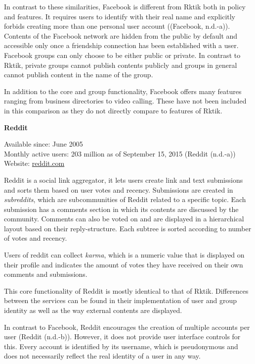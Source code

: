 In contrast to these similarities, Facebook is different from Rktik both
in policy and features. It requires users to identify with their real
name and explicitly forbids creating more than one personal user account
((Facebook, n.d.-a)). Contents of the Facebook network are hidden from
the public by default and accessible only once a friendship connection
has been established with a user. Facebook groups can only choose to be
either public or private. In contrast to Rktik, private groups cannot
publish contents publicly and groups in general cannot publish content
in the name of the group.

In addition to the core and group functionality, Facebook offers many
features ranging from business directories to video calling. These have
not been included in this comparison as they do not directly compare to
features of Rktik.

\textbf{Reddit}

Available since: June 2005\\
Monthly active users: 203 million as of September 15, 2015 (Reddit
(n.d.-a))\\
Website: \href{https://reddit.com}{reddit.com}

Reddit is a social link aggregator, it lets users create link and text
submissions and sorts them based on user votes and recency. Submissions
are created in \emph{subreddits}, which are subcommunities of Reddit
related to a specific topic. Each submission has a comments section in
which its contents are discussed by the community. Comments can also be
voted on and are displayed in a hierarchical layout based on their
reply-structure. Each subtree is sorted according to number of votes and
recency.

Users of reddit can collect \emph{karma}, which is a numeric value that
is displayed on their profile and indicates the amount of votes they
have received on their own comments and submissions.

This core functionality of Reddit is mostly identical to that of Rktik.
Differences between the services can be found in their implementation of
user and group identity as well as the way external contents are
displayed.

In contrast to Facebook, Reddit encourages the creation of multiple
accounts per user (Reddit (n.d.-b)). However, it does not provide user
interface controls for this. Every account is identified by its
username, which is pseudonymous and does not necessarily reflect the
real identity of a user in any way.

